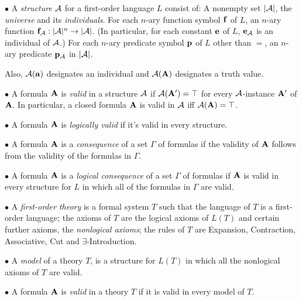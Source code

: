 \item{$\bullet$} A {\it structure} $\cal A$ for a first-order language $L$ consist of:
 A nonempty set $|{\cal A}|$, the {\it universe} and its {\it individuals}.
 For each $n$-ary function symbol ${\bf f}$ of $L$, an $n$-ary function 
${\bf f}_{\cal A} : |{\cal A}|^n \to |{\cal A}|$. (In particular, for each constant 
${\bf e}$ of $L$, ${\bf e}_{\cal A}$ is an individual of $\cal A$.)
 For each $n$-ary predicate symbol ${\bf p}$ of $L$ other than $=$, an 
$n$-ary predicate ${\bf p}_{\cal A}$ in $|{\cal A}|$.

Also, ${\cal A}({\bf a})$ designates an individual and ${\cal A}({\bf A})$ designates a truth value.
\smallskip

\item{$\bullet$} A formula ${\bf A}$ is {\it valid} in a structure ${\cal A}$ if ${\cal A}({\bf A}') = \top$ for 
every ${\cal A}$-instance ${\bf A}'$ of ${\bf A}$. In particular, a closed formula ${\bf A}$ is valid in
${\cal A}$ iff ${\cal A}({\bf A}) = \top$.
\smallskip

\item{$\bullet$} A formula ${\bf A}$ is {\it logically valid} if it's valid in every structure.
\smallskip

\item{$\bullet$} A formula ${\bf A}$ is a {\it consequence} of a set $\Gamma$ of formulas if the 
validity of ${\bf A}$ follows from the validity of the formulas in $\Gamma$.
\smallskip

\item{$\bullet$} A formula ${\bf A}$ is a {\it logical consequence} of a set $\Gamma$ of formulas 
if ${\bf A}$ is valid in every structure for $L$ in which all of the formulas in $\Gamma$ are valid.
\smallskip

\item{$\bullet$} A {\it first-order theory} is a formal system $T$ such that
 the language of $T$ is a first-order language;
 the axioms of $T$ are the logical axioms of $L(T)$ and certain further axioms, the {\it nonlogical axioms};
 the rules of $T$ are Expansion, Contraction, Associative, Cut and $\exists$-Introduction.
\smallskip

\item{$\bullet$} A {\it model} of a theory $T$, is a structure for $L(T)$ in which all the nonlogical axioms of $T$ are valid.

\item{$\bullet$} A formula ${\bf A}$ is {\it valid} in a theory $T$ if it is valid in every model of $T$.

